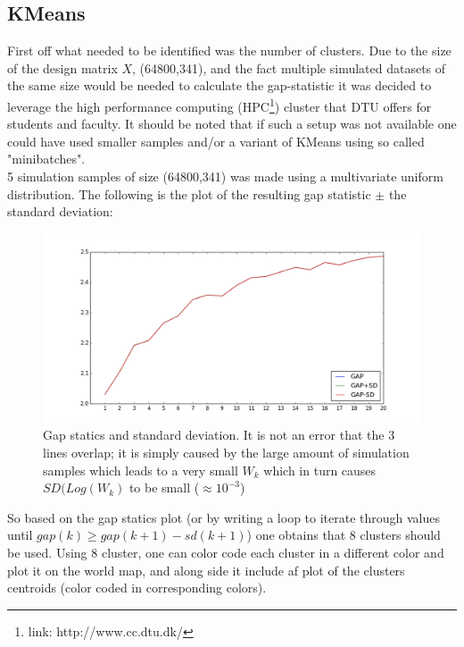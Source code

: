 \subsection{KMeans}
First off what needed to be identified was the number of clusters. 
Due to the size of the design matrix $X$, (64800,341), and the fact multiple simulated datasets of the same size would be needed to calculate the gap-statistic it was decided to leverage the high performance computing (HPC\footnote{link: http://www.cc.dtu.dk/}) cluster that DTU offers for students and faculty. 
 It should be noted that if such a setup was not available one could have used smaller samples and/or a variant of KMeans using so called "minibatches". \\
5 simulation samples of size (64800,341) was made using a multivariate uniform distribution. The following is the plot of the resulting gap statistic $\pm$ the standard deviation:

\begin{figure}[H]
	\center
	\includegraphics[width=\textwidth]{figures/gap.png}
	\caption{Gap statics and standard deviation. It is not an error that the 3 lines overlap; it is simply caused by the large amount of simulation samples which leads to a very small $W_k$ which in turn causes $SD(Log(W_k)$ to be small ($\approx 10^{-3}$)}
	\label{fig:gap}
\end{figure}

So based on the gap statics plot (or by writing a loop to iterate through values until $gap(k)\ge gap(k+1)-sd(k+1)$) one obtains that 8 clusters should be used. Using 8 cluster, one can color code each cluster in a different color and plot it on the world map, and along side it include af plot of the clusters centroids (color coded in corresponding colors).


